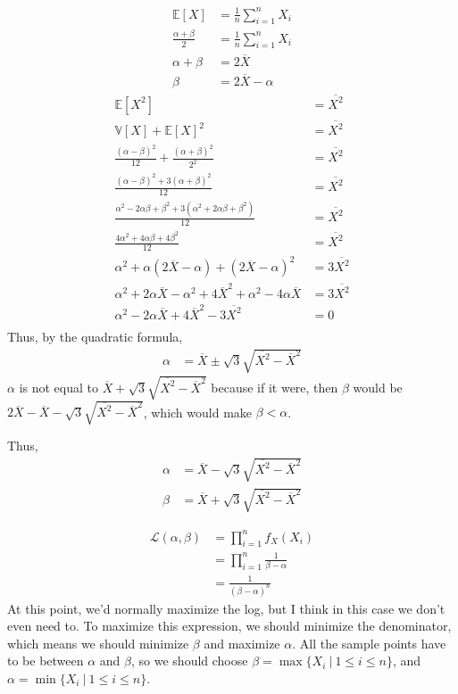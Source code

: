 \documentclass[12pt]{article}
\begin{document}
\medskip
{}
\begin{align*}
    \mathbb E[X] &= \frac1n\sum_{i=1}^n X_i \\
    \frac{\alpha + \beta}2 &= \frac1n\sum_{i=1}^n X_i \\
    \alpha + \beta &= 2\overline X \\
    \beta &= 2\overline X - \alpha
\end{align*}
\begin{align*}
    \mathbb E[X^2] &= \overline{X^2} \\
    \mathbb V[X] + \mathbb E[X]^2 &= \overline{X^2} \\
    \frac{(\alpha - \beta)^2}{12} + \frac{(\alpha + \beta)^2}{2^2} &= \overline{X^2} \\
    \frac{(\alpha - \beta)^2 + 3(\alpha + \beta)^2}{12} &= \overline{X^2} \\
    \frac{\alpha^2 -2\alpha\beta + \beta^2 + 3(\alpha^2 + 2\alpha\beta + \beta^2)}{12} &= \overline{X^2} \\
    \frac{4\alpha^2 + 4\alpha\beta + 4\beta^2}{12} &= \overline{X^2} \\
    \alpha^2 + \alpha(2\overline X - \alpha) + (2\overline X - \alpha)^2 &= 3\overline{X^2} \\
    \alpha^2 + 2\alpha\overline X - \alpha^2 + 4\overline X^2 + \alpha^2 - 4\alpha\overline X &= 3\overline{X^2} \\
    \alpha^2 - 2\alpha\overline X + 4\overline X^2 - 3\overline{X^2} &= 0 \\
\end{align*} Thus, by the quadratic formula,
\begin{align*}
    \alpha &= \overline{X} \pm \sqrt3 \sqrt{\overline{X^2} - \overline{X}^2}
\end{align*} $\alpha$ is not equal to $\overline{X} + \sqrt3 \sqrt{\overline{X^2} - \overline{X}^2}$ because if it were, then $\beta$ would be $2\overline X - \overline{X} - \sqrt3 \sqrt{\overline{X^2} - \overline{X}^2}$, which would make $\beta < \alpha$.

Thus,
\begin{align*}
    \alpha &= \overline{X} - \sqrt3 \sqrt{\overline{X^2} - \overline{X}^2} \\
    \beta &= \overline{X} + \sqrt3 \sqrt{\overline{X^2} - \overline{X}^2}
\end{align*}

\newpage
{}
\begin{align*}
    \mathcal L(\alpha, \beta) &= \prod_{i=1}^n f_X(X_i) \\
                              &= \prod_{i=1}^n \frac1{\beta - \alpha} \\
                              &= \frac1{(\beta - \alpha)^n}
\end{align*} At this point, we'd normally maximize the log, but I think in this case we don't even need to. To maximize this expression, we should minimize the denominator, which means we should minimize $\beta$ and maximize $\alpha$. All the sample points have to be between $\alpha$ and $\beta$, so we should choose $\beta = \max\{X_i~|~1 \leq i \leq n\}$, and $\alpha = \min\{X_i~|~1 \leq i \leq n\}$.
\end{document}
